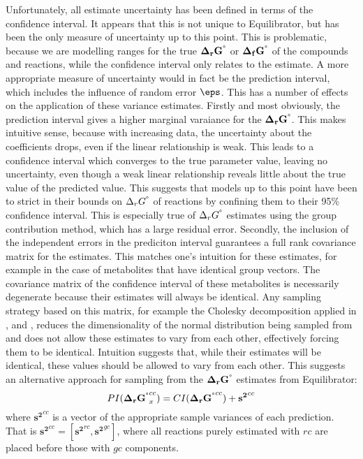 \documentclass[10pt,letterpaper]{article}
\newcommand{\sdgf}{\Delta_fG^{\degree}}
\newcommand{\sdgr}{\Delta_rG^{\degree}}
\newcommand{\bsdgf}{\mathbf{\sdgf}}
\newcommand{\bsdgr}{\mathbf{\sdgr}}
\begin{document}
Unfortunately, all estimate uncertainty has been defined in terms of the confidence interval.
It appears that this is not unique to Equilibrator, but has been the only measure of uncertainty up to this point.
This is problematic, because we are modelling ranges for the true $\bsdgr$ or $\bsdgf$ of the compounds and reactions, while the confidence interval only relates to the estimate.
A more appropriate measure of uncertainty would in fact be the prediction interval, which includes the influence of random error $\eps$.
This has a number of effects on the application of these variance estimates.
Firstly and most obviously, the prediction interval gives a higher marginal varaiance for the $\bsdgr$.
This makes intuitive sense, because with increasing data, the uncertainty about the coefficients drops, even if the linear relationship is weak.
This leads to a confidence interval which converges to the true parameter value, leaving no uncertainty, even though a weak linear relationship reveals little about the true value of the predicted value.
This suggests that models up to this point have been to strict in their bounds on $\sdgr$ of reactions by confining them to their 95\% confidence interval.
This is especially true of $\sdgr$ estimates using the group contribution method, which has a large residual error.
Secondly, the inclusion of the independent errors in the prediciton interval guarantees a full rank covariance matrix for the estimates.
This matches one's intuition for these estimates, for example in the case of metabolites that have identical group vectors.
The covariance matrix of the confidence interval of these metabolites is necessarily degenerate because their estimates will always be identical.
Any sampling strategy based on this matrix, for example the Cholesky decomposition applied in \cite{multiTFA}, \cite{gollub_2021_prob_sampling} and \cite{equilibrator_3_beber_noor},
 reduces the dimensionality of the normal distribution being sampled from and does not allow these estimates to vary from each other, effectively forcing them to be identical.
Intuition suggests that, while their estimates will be identical, these values should be allowed to vary from each other.
This suggests an alternative approach for sampling from the $\bsdgr$ estimates from Equilibrator:
\[
    PI(\bsdgr_x^{cc}) = CI(\bsdgr^{cc}) + \mathbf{s^2}^{cc}
\]
where $\mathbf{s^2}^{cc}$ is a vector of the appropriate sample variances of each prediction.
That is $\mathbf{s^2}^{cc} = [\mathbf{s^2}^{rc}, \mathbf{s^2}^{gc}]$, where all reactions purely estimated with $rc$ are placed before those with $gc$ components.
\end{document}
